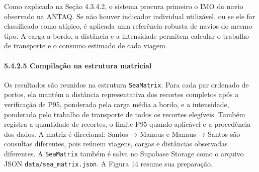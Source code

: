 \documentclass[brazil,]{article}
\let\oldparagraph\paragraph
\renewcommand{\paragraph}[1]{\Needspace{7\baselineskip}\oldparagraph{#1}\mbox{}}
\begin{document}
Como explicado na Seção 4.3.4.2, o sistema procura primeiro o IMO do
navio observado na ANTAQ. Se não houver indicador individual utilizável,
ou se ele for classificado como atípico, é aplicada uma referência
robusta de navios do mesmo tipo. A carga a bordo, a distância e a
intensidade permitem calcular o trabalho de transporte e o consumo
estimado de cada viagem.

\hypertarget{compilauxe7uxe3o-na-estrutura-matricial}{%
\paragraph{5.4.2.5 Compilação na estrutura
matricial}\label{compilauxe7uxe3o-na-estrutura-matricial}}

Os resultados são reunidos na estrutura \texttt{SeaMatrix}. Para cada
par ordenado de portos, ela mantém a distância representativa dos
recortes completos após a verificação de P95, ponderada pela carga média
a bordo, e a intensidade, ponderada pelo trabalho de transporte de todos
os recortes elegíveis. Também registra a quantidade de recortes, o limite
P95 quando aplicável e a procedência dos dados. A matriz é direcional:
Santos → Manaus e Manaus → Santos são consultas diferentes, pois reúnem
viagens, cargas e distâncias observadas diferentes. A \texttt{SeaMatrix}
também é salva no Supabase Storage como o arquivo JSON
\texttt{data/sea\_matrix.json}. A Figura 14 resume sua preparação.

\begin{center}
\end{center}
\end{document}
